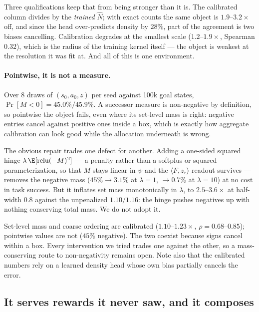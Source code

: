 Three qualifications keep that from being stronger than it is. The calibrated
column divides by the \emph{trained} $\hat N$; with exact counts the same object is
$1.9$--$3.2\times$ off, and since the head over-predicts density by $28\%$, part of
the agreement is two biases cancelling. Calibration degrades at the smallest scale
($1.2$--$1.9\times$, Spearman $0.32$), which is the radius of the training kernel
itself --- the object is weakest at the resolution it was fit at. And all of this
is one environment.

\paragraph{Pointwise, it is not a measure.}
Over $8$ draws of $(s_0,a_0,z)$ per seed against 100k goal states,
$\Pr[M<0] = 45.0\%/45.9\%$. A successor measure is non-negative by definition, so
pointwise the object fails, even where its set-level mass is right: negative
entries cancel against positive ones inside a box, which is exactly how aggregate
calibration can look good while the allocation underneath is wrong.

The obvious repair trades one defect for another. Adding a one-sided squared hinge
$\lambda\,\E[\mathrm{relu}(-M)^2]$ --- a penalty rather than a softplus or squared
parameterization, so that $M$ stays linear in $\psi$ and the $\langle F,z_r\rangle$
readout survives --- removes the negative mass ($45\%\to3.1\%$ at $\lambda{=}1$,
$\to0.7\%$ at $\lambda{=}10$) at no cost in task success. But it inflates set mass
monotonically in $\lambda$, to $2.5$--$3.6\times$ at half-width $0.8$ against the
unpenalized $1.10/1.16$: the hinge pushes negatives up with nothing conserving
total mass. We do not adopt it.

\begin{takeaway}
Set-level mass and coarse ordering are calibrated ($1.10$--$1.23\times$,
$\rho=0.68$--$0.85$); pointwise values are not ($45\%$ negative). The two coexist
because signs cancel within a box. Every intervention we tried trades one against
the other, so a mass-conserving route to non-negativity remains open. Note also
that the calibrated numbers rely on a learned density head whose own bias
partially cancels the error.
\end{takeaway}

\subsection{It serves rewards it never saw, and it composes}
\label{sec:exp-l2}

